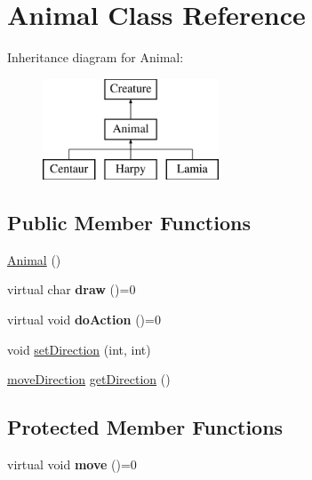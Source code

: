 \hypertarget{class_animal}{}\section{Animal Class Reference}
\label{class_animal}
Inheritance diagram for Animal\+:\begin{figure}[H]
\begin{center}
\leavevmode
\includegraphics[height=3.000000cm]{class_animal}
\end{center}
\end{figure}
\subsection*{Public Member Functions}
\begin{DoxyCompactItemize}
\item 
\hyperlink{class_animal_a1e726a49ec952443190ac62dad22353c}{Animal} ()
\item 
virtual char {\bfseries draw} ()=0\hypertarget{class_animal_a66c6953f374456d286aa7ae3ab0b80a0}{}\label{class_animal_a66c6953f374456d286aa7ae3ab0b80a0}

\item 
virtual void {\bfseries do\+Action} ()=0\hypertarget{class_animal_a997961a1ecd5c6e0529d8768521b58a9}{}\label{class_animal_a997961a1ecd5c6e0529d8768521b58a9}

\item 
void \hyperlink{class_animal_aee564f22d8d74725c7f718ae5fcf2cd9}{set\+Direction} (int, int)
\item 
\hyperlink{structmove_direction}{move\+Direction} \hyperlink{class_animal_a64d1215d871925e471b94b35ab1f8795}{get\+Direction} ()
\end{DoxyCompactItemize}
\subsection*{Protected Member Functions}
\begin{DoxyCompactItemize}
\item 
virtual void {\bfseries move} ()=0\hypertarget{class_animal_a0b36674071f5144d1e33507b8b90c87d}{}\label{class_animal_a0b36674071f5144d1e33507b8b90c87d}

\end{DoxyCompactItemize}


